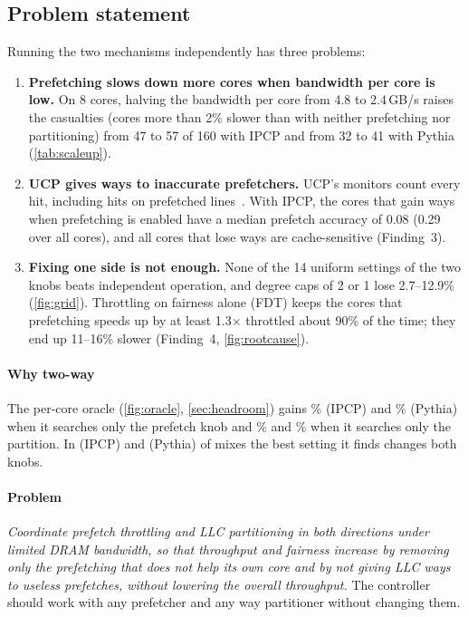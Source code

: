 \subsection{Problem statement}
\label{sec:statement}

Running the two mechanisms independently has three problems:
\begin{enumerate}
  \item \textbf{Prefetching slows down more cores when bandwidth per core is low.}  On 8 cores, halving the bandwidth
        per core from 4.8 to 2.4\,GB/s raises the casualties (cores more than 2\% slower than with neither prefetching
        nor partitioning) from 47 to 57 of 160 with IPCP and from 32 to 41 with Pythia (\cref{tab:scaleup}).
  \item \textbf{UCP gives ways to inaccurate prefetchers.}  UCP's monitors count every hit, including hits on
        prefetched lines~\cite{qureshi2006ucp}.  With IPCP, the cores that gain ways when prefetching is enabled have
        a median prefetch accuracy of 0.08 (0.29 over all cores), and all cores that lose ways are cache-sensitive
        (Finding~3).
  \item \textbf{Fixing one side is not enough.}  None of the 14 uniform settings of the two knobs beats independent
        operation, and degree caps of 2 or 1 lose 2.7--12.9\% (\cref{fig:grid}).  Throttling on fairness alone (FDT)
        keeps the cores that prefetching speeds up by at least 1.3$\times$ throttled about 90\% of the time; they end
        up 11--16\% slower (Finding~4, \cref{fig:rootcause}).
\end{enumerate}

\paragraph{Why two-way}
The per-core oracle (\cref{fig:oracle}, \cref{sec:headroom}) gains \KnIpPf\% (IPCP) and \KnPyPf\% (Pythia) when it
searches only the prefetch knob and \KnIpPart\% and \KnPyPart\% when it searches only the partition.  In \KnIpBoth{}
(IPCP) and \KnPyBoth{} (Pythia) of \KnIpN{} mixes the best setting it finds changes both knobs.

\paragraph{Problem}
\emph{Coordinate prefetch throttling and LLC partitioning in both directions under limited DRAM bandwidth, so that
throughput and fairness increase by removing only the prefetching that does not help its own core and by not giving
LLC ways to useless prefetches, without lowering the overall throughput.}  The controller should work with any prefetcher and any way partitioner without changing them.
